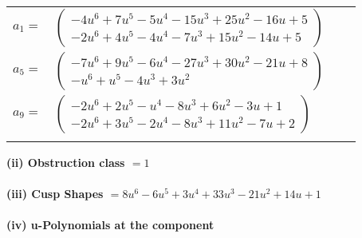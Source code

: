\documentclass[1p]{elsarticle_modified}
\theoremstyle{definition}
\begin{document}
\begin{tabular}{m{7pt} m{180pt} m{7pt} m{180pt} }
\flushright $a_{1}=$&$\begin{pmatrix}-4 u^6+7 u^5-5 u^4-15 u^3+25 u^2-16 u+5\\-2 u^6+4 u^5-4 u^4-7 u^3+15 u^2-14 u+5\end{pmatrix}$ \\
\flushright $a_{5}=$&$\begin{pmatrix}-7 u^6+9 u^5-6 u^4-27 u^3+30 u^2-21 u+8\\- u^6+u^5-4 u^3+3 u^2\end{pmatrix}$ \\
\flushright $a_{9}=$&$\begin{pmatrix}-2 u^6+2 u^5- u^4-8 u^3+6 u^2-3 u+1\\-2 u^6+3 u^5-2 u^4-8 u^3+11 u^2-7 u+2\end{pmatrix}$\\&\end{tabular}
\flushleft \textbf{(ii) Obstruction class $= 1$}\\~\\
\flushleft \textbf{(iii) Cusp Shapes $= 8 u^6-6 u^5+3 u^4+33 u^3-21 u^2+14 u+1$}\\~\\
\newpage\renewcommand{\arraystretch}{1}
\flushleft \textbf{(iv) u-Polynomials at the component}\newline \\
\end{document}
